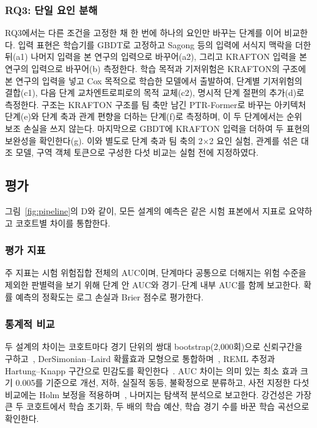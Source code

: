 \subsubsection{RQ3: 단일 요인 분해}
\label{sec:method:decomposition}
RQ3에서는 다른 조건을 고정한 채 한 번에 하나의 요인만 바꾸는 단계를 이어 비교한다.
입력 표현은 학습기를 GBDT로 고정하고 Sagong 등의 입력에 서식지 맥락을 더한 뒤(a1) 나머지 입력을 본 연구의 입력으로 바꾸어(a2), 그리고 KRAFTON 입력을 본 연구의 입력으로 바꾸어(b) 측정한다.
학습 목적과 기저위험은 KRAFTON의 구조에 본 연구의 입력을 넣고 Cox 목적으로 학습한 모델에서 출발하여, 단계별 기저위험의 결합(c1), 다음 단계 교차엔트로피로의 목적 교체(c2), 명시적 단계 절편의 추가(d)로 측정한다.
구조는 KRAFTON 구조를 팀 축만 남긴 PTR-Former로 바꾸는 아키텍처 단계(e)와 단계 축과 관계 편향을 더하는 단계(f)로 측정하며, 이 두 단계에서는 순위 보조 손실을 쓰지 않는다.
마지막으로 GBDT에 KRAFTON 입력을 더하여 두 표현의 보완성을 확인한다(g).
이와 별도로 단계 축과 팀 축의 2$\times$2 요인 실험, 관계를 섞은 대조 모델, 구역 객체 토큰으로 구성한 다섯 비교는 실험 전에 지정하였다.

\subsection{평가}
\label{sec:method:evaluation}
그림~\ref{fig:pipeline}의 D와 같이, 모든 설계의 예측은 같은 시험 표본에서 지표로 요약하고 코호트별 차이를 통합한다.

\subsubsection{평가 지표}
주 지표는 시험 위험집합 전체의 AUC이며, 단계마다 공통으로 더해지는 위험 수준을 제외한 판별력을 보기 위해 단계 안 AUC와 경기--단계 내부 AUC를 함께 보고한다.
확률 예측의 정확도는 로그 손실과 Brier 점수로 평가한다. 

\subsubsection{통계적 비교}
두 설계의 차이는 코호트마다 경기 단위의 쌍대 bootstrap(2,000회)으로 신뢰구간을 구하고~\cite{Efron93}, DerSimonian--Laird 확률효과 모형으로 통합하며~\cite{DerSimonian86}, REML 추정과 Hartung--Knapp 구간으로 민감도를 확인한다~\cite{Viechtbauer05,HartungKnapp01}.
AUC 차이는 의미 있는 최소 효과 크기 0.005를 기준으로 개선, 저하, 실질적 동등, 불확정으로 분류하고, 사전 지정한 다섯 비교에는 Holm 보정을 적용하며~\cite{Holm79}, 나머지는 탐색적 분석으로 보고한다.
강건성은 가장 큰 두 코호트에서 학습 초기화, 두 배의 학습 예산, 학습 경기 수를 바꾼 학습 곡선으로 확인한다.
